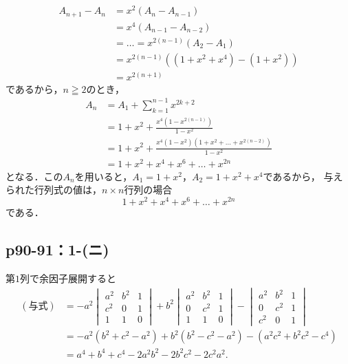\documentclass[a4paper,10pt,fleqn]{ltjsarticle}
\begin{document}
\begin{tleftbar}
    \begin{align*}
        A_{n+1}-A_{n} & = x^2 (A_n-A_{n-1})                   \\
                      & = x^4 (A_{n-1} - A_{n-2})             \\
                      & = \dots = x^{2(n-1)}(A_2-A_1)         \\
                      & = x^{2(n-1)} ((1+x^2 + x^4) -(1+x^2)) \\
                      & = x^{2(n+1)}
    \end{align*}
    であるから，$n \geqq 2$のとき，
    \begin{align*}
        A_n & = A_1 +\sum_{k=1}^{n-1} x^{2k+2}                                \\
            & = 1+x^2 + \frac{x^4(1-x^{2(n-1)})}{1-x^2}                       \\
            & = 1+x^2 + \frac{x^4 (1-x^2)(1+x^2 + \dots + x^{2(n-2)})}{1-x^2} \\
            & = 1+x^2 + x^4 + x^6 + \dots + x^{2n}
    \end{align*}
    となる．この$ A_n$を用いると，$ A_1 = 1+x^2 $，$ A_2 = 1+x^2+x^4$であるから，
    与えられた行列式の値は，$n \times n$行列の場合
    \[
        1+x^2 + x^4 + x^6 + \dots + x^{2n}
    \]
    である．
\end{tleftbar}

\newpage

\subsection*{p90-91：1-(ニ)}

\begin{tleftbar}
    第$1$列で余因子展開すると
    \begin{align*}
        (\text{与式}) & = -a^2\begin{vmatrix} a^2 & b^2 & 1 \\ c^2 & 0 & 1 \\ 1 & 1 & 0 \end{vmatrix}+b^2 \begin{vmatrix} a^2 & b^2 & 1 \\ 0 & c^2 & 1 \\ 1 & 1 & 0 \end{vmatrix} - \begin{vmatrix} a^2 & b^2 & 1 \\ 0 & c^2 & 1 \\ c^2 & 0 & 1 \end{vmatrix} \\
                    & = -a^2 (b^2+c^2 -a^2) +b^2 (b^2-c^2-a^2)- (a^2c^2+b^2c^2-c^4)                                                                                                                                                                         \\
                    & =a^4+b^4+c^4 -2a^2b^2 - 2b^2 c^2 -2c^2 a^2 .
    \end{align*}
\end{tleftbar}
\newpage
\end{document}
